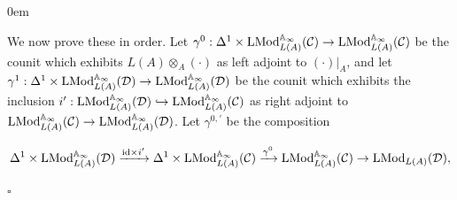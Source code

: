 \documentclass[10pt]{article}
\newcommand{\C}{\mathcal C}
\newcommand{\cD}{\mathcal{D}}
\def\AA{{\mathbb A}}
\renewcommand{\qed}{\hfill$\square$}
\renewenvironment{proof}{\begin{addmargin}[1em]{0em}\begin{newproof}}{\end{newproof}\end{addmargin}\qed}
\theoremstyle{witharg}
\theoremstyle{witharg}
\theoremstyle{witharg2}
\begin{document}
\begin{proof}
\begin{itemize}
\end{itemize}

\noindent We now prove these in order. Let $\gamma^0:\Delta^1\times \textnormal{LMod}^{\AA_\infty}_{L(A)}(\C)\rightarrow \textnormal{LMod}^{\AA_\infty}_{L(A)}(\C)$ be the counit which exhibits $L(A)\otimes_A(\cdot)$ as left adjoint to $(\cdot)|_{A}$, and let $\gamma^1:\Delta^1\times \textnormal{LMod}^{\AA_\infty}_{L(A)}(\cD)\rightarrow \textnormal{LMod}^{\AA_\infty}_{L(A)}(\cD)$ be the counit which exhibits the inclusion $i^\prime:\textnormal{LMod}^{\AA_\infty}_{L(A)}(\cD)\hookrightarrow \textnormal{LMod}^{\AA_\infty}_{L(A)}(\C)$ as right adjoint to $\textnormal{LMod}^{\AA_\infty}_{L(A)}(\C)\rightarrow \textnormal{LMod}^{\AA_\infty}_{L(A)}(\cD)$. Let $\gamma^{0,\prime}$ be the composition 

$$\Delta^1\times \textnormal{LMod}^{\AA_\infty}_{L(A)}(\cD)\xrightarrow{\textnormal{id}\times i^\prime}\Delta^1\times \textnormal{LMod}^{\AA_\infty}_{L(A)}(\C)\xrightarrow{\gamma^0}\textnormal{LMod}^{\AA_\infty}_{L(A)}(\C)\rightarrow \textnormal{LMod}_{L(A)}(\cD),$$



\end{proof}
\end{document}
